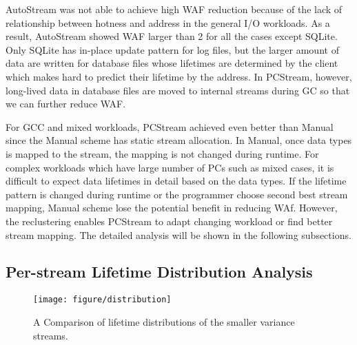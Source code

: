 AutoStream was not able to achieve high WAF reduction because of 
the lack of relationship between hotness and address in the general I/O workloads.
As a result, AutoStream showed WAF larger than 2 for all the cases except SQLite.
Only SQLite has in-place update pattern for log files, but the larger amount of data are
written for database files whose lifetimes are determined by the client
which makes hard to predict their lifetime by the address.
In PCStream, however, long-lived data in database files are moved to internal streams
during GC so that we can further reduce WAF.

For GCC and mixed workloads, PCStream achieved even better than Manual
since the Manual scheme has static stream allocation.
In Manual, once data types is mapped to the stream, the mapping is not changed 
during runtime.
For complex workloads which have large number of PCs such as mixed cases,
it is difficult to expect data lifetimes in detail based on the data types.
If the lifetime pattern is changed during runtime or the programmer choose
second best stream mapping,
Manual scheme lose the potential benefit in reducing WAf.
However, the reclustering enables PCStream to adapt changing workload or find
better stream mapping.
The detailed analysis will be shown in the following subsections.

\begin{comment}
For example, both \textsf{\small PCStream} and \textsf{\small Manual} reduced WAF by 38\% over \textsf{\small Baseline} for the \texttt{UR} case. 
Compared with \textsf{\small AutoStream}, \textsf{\small PCStream} was more effective, reducing WAF more by 35\% on average.  
\textsf{\small PCStream} outperformed \textsf{\small AutoStream} by reducing WAF by 35\% on average.
Fig. 6 also indicates that the two-phase stream assignment technique is effective.  
\textsf{\small PCStream} outperformed \textsf{\small PCStream$^{*}$} by 12\% on average in the WAF reduction.
As shown in Fig. 6, \textsf{\small PCStream$^*$} reduced WAF by up to 30\% over \textsf{\small AutoStream}.  
\end{comment}

\subsection{Per-stream Lifetime Distribution Analysis}

\begin{figure}[t]
	\centering
	\texttt{[image: figure/distribution]}
	\caption{A Comparison of lifetime distributions of the smaller variance streams.}
	\label{fig:distribution}
\end{figure}

